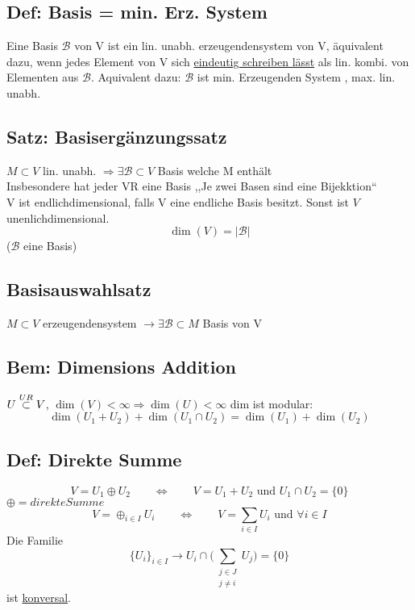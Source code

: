 \documentclass[titlepage,12pt,a4paper,ngerman]{report}
\begin{document}
\subsection{Def: Basis = min. Erz. System} Eine Basis $\mathcal{B}$ von V ist ein lin. unabh. erzeugendensystem von V, äquivalent dazu, wenn jedes Element von V sich \underline{eindeutig schreiben lässt} als lin. kombi. von Elementen aus $\mathcal{B}$. Aquivalent dazu: $\mathcal{B}$ ist min. Erzeugenden System , max. lin. unabh.\\
\subsection{Satz: Basisergänzungssatz}
$M\subset V$ lin. unabh. $\Rightarrow\exists \mathcal{B} \subset V $ Basis welche M enthält\\
Insbesondere hat jeder VR eine Basis ,,Je zwei Basen sind eine Bijekktion``\\
V ist endlichdimensional, falls V eine endliche Basis besitzt. Sonst ist $V$ unenlichdimensional.\\
$$\dim(V) = | \mathcal{B} | $$ ($\mathcal{B}$ eine Basis)\\

\subsection{Basisauswahlsatz}
$M\subset V$ erzeugendensystem $\rightarrow \exists \mathcal{B} \subset M $ Basis von V
\subsection{Bem: Dimensions Addition} 
$U\buildrel UR \over \subset V$, 
$\dim(V) < \infty \Rightarrow \dim(U) < \infty$
dim ist modular:
$$\dim(U_1 + U_2) + \dim(U_1 \cap U_2) = \dim(U_1) + \dim(U_2)$$

\subsection{Def: Direkte Summe}
$$V=U_1 \oplus U_2 \qquad \Leftrightarrow \qquad V= U_1 + U_2\textrm{ und }  U_1 \cap U_2 = \{0\}$$
$\oplus = direkte Summe$\\
$$ V = \oplus_{i \in I} U_{i} \qquad \Leftrightarrow \qquad V = \sum_{i\in I } U_i \textrm{ und } \forall i \in I $$
Die Familie $$\{U_i\}_{i \in I} \rightarrow U_i \cap \Big(\sum_{\substack{j\in J\\ j\neq i}} U_j \Big)=\{0\}$$
ist \underline{konversal}.
\end{document}
